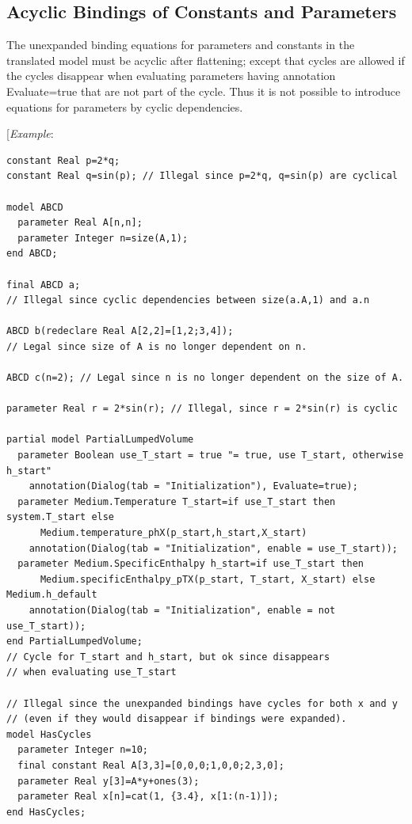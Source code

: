 \documentclass[10pt,a4paper]{report}
\def\doublelabel#1{\label{#1}}
\begin{document}
\subsection{Acyclic Bindings of Constants and Parameters}\doublelabel{acyclic-bindings-of-constants-and-parameters}

The unexpanded binding equations for parameters and constants in the
translated model must be acyclic after flattening; except that cycles
are allowed if the cycles disappear when evaluating parameters having
annotation Evaluate=true that are not part of the cycle. Thus it is not
possible to introduce equations for parameters by cyclic dependencies.

{[}\emph{Example}:
\begin{lstlisting}[language=modelica]
constant Real p=2*q;
constant Real q=sin(p); // Illegal since p=2*q, q=sin(p) are cyclical

model ABCD
  parameter Real A[n,n];
  parameter Integer n=size(A,1);
end ABCD;

final ABCD a;
// Illegal since cyclic dependencies between size(a.A,1) and a.n

ABCD b(redeclare Real A[2,2]=[1,2;3,4]);
// Legal since size of A is no longer dependent on n.

ABCD c(n=2); // Legal since n is no longer dependent on the size of A.

parameter Real r = 2*sin(r); // Illegal, since r = 2*sin(r) is cyclic

partial model PartialLumpedVolume
  parameter Boolean use_T_start = true "= true, use T_start, otherwise h_start"
    annotation(Dialog(tab = "Initialization"), Evaluate=true);
  parameter Medium.Temperature T_start=if use_T_start then system.T_start else
      Medium.temperature_phX(p_start,h_start,X_start)
    annotation(Dialog(tab = "Initialization", enable = use_T_start));
  parameter Medium.SpecificEnthalpy h_start=if use_T_start then
      Medium.specificEnthalpy_pTX(p_start, T_start, X_start) else Medium.h_default
    annotation(Dialog(tab = "Initialization", enable = not use_T_start));
end PartialLumpedVolume;
// Cycle for T_start and h_start, but ok since disappears
// when evaluating use_T_start

// Illegal since the unexpanded bindings have cycles for both x and y
// (even if they would disappear if bindings were expanded).
model HasCycles
  parameter Integer n=10;
  final constant Real A[3,3]=[0,0,0;1,0,0;2,3,0];
  parameter Real y[3]=A*y+ones(3);
  parameter Real x[n]=cat(1, {3.4}, x[1:(n-1)]);
end HasCycles;
\end{lstlisting}
\end{document}
